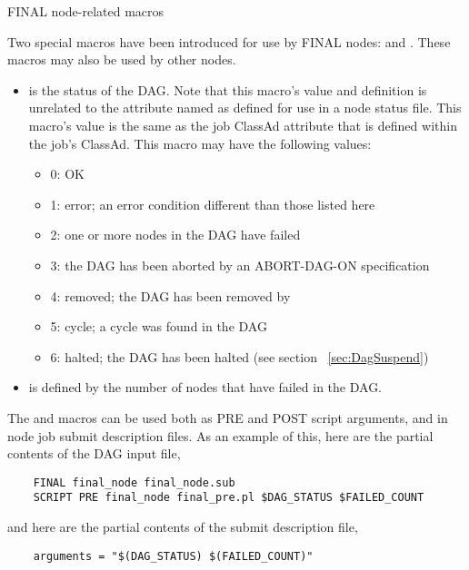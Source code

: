 \begin{description}
\item[FINAL node-related macros]
\end{description}

Two special macros have been introduced for use by FINAL nodes:
 and .
These macros may also be used by other nodes.

\begin{itemize}
\item {} is the status of the DAG.
Note that this macro's value and definition is unrelated to the attribute 
named  as defined for use in a node status file.
This macro's value is the same as the job ClassAd attribute 
that is defined within the  job's ClassAd.
This macro may have the following values:
\begin{itemize}
\item 0: OK
\item 1: error; an error condition different than those listed here
\item 2: one or more nodes in the DAG have failed
\item 3: the DAG has been aborted by an ABORT-DAG-ON specification
\item 4: removed; the DAG has been removed by 
\item 5: cycle; a cycle was found in the DAG
\item 6: halted; the DAG has been halted (see section ~\ref{sec:DagSuspend})
\end{itemize}

\item {} is defined by the number of nodes that have failed in the
DAG.
\end{itemize}

The  and  macros can be used both
as PRE and POST script arguments, and in node job submit description files.
As an example of this, here are the partial contents of the DAG input file,
\begin{verbatim}
    FINAL final_node final_node.sub
    SCRIPT PRE final_node final_pre.pl $DAG_STATUS $FAILED_COUNT
\end{verbatim}

and here are the partial contents of the submit description file, 
\begin{verbatim}
    arguments = "$(DAG_STATUS) $(FAILED_COUNT)"
\end{verbatim}

